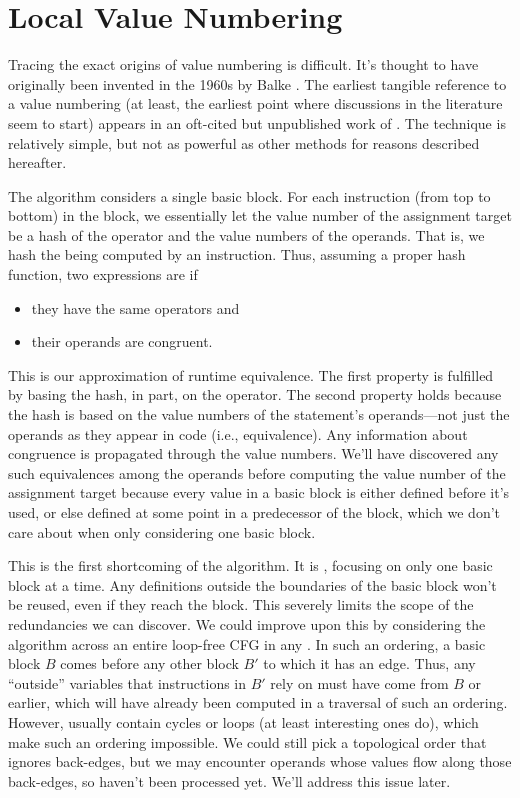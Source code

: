 \section{Local Value Numbering}\label{sec:vn:local}

Tracing the exact origins of value numbering is difficult.  It's thought to
have originally been invented in the 1960s by Balke \autocite{Simpson}.  The
earliest tangible reference to a value numbering (at least, the earliest point
where discussions in the literature seem to start) appears in an oft-cited but
unpublished work of \citeauthor{Cocke} \autocite*{Cocke}.  The technique is
relatively simple, but not as powerful as other methods for reasons described
hereafter.

The algorithm considers a single basic block.  For each instruction (from top
to bottom) in the block, we essentially let the value number of the assignment
target be a hash of the operator and the value numbers of the operands.  That
is, we hash the  being computed by an instruction.  Thus,
assuming a proper hash function, two expressions are  if
%
\begin{itemize}
%
  \item they have the same operators and
%
  \item their operands are congruent.
%
\end{itemize}
%
\noindent This is our approximation of runtime equivalence.  The first property
is fulfilled by basing the hash, in part, on the operator.  The second property
holds because the hash is based on the value numbers of the statement's
operands---not just the operands as they appear in code (i.e., 
equivalence).  Any information about congruence is propagated through the value
numbers.  We'll have discovered any such equivalences among the operands before
computing the value number of the assignment target because every value in a
basic block is either defined before it's used, or else defined at some point
in a predecessor of the block, which we don't care about when only considering
one basic block.

This is the first shortcoming of the algorithm.  It is , focusing
on only one basic block at a time.  Any definitions outside the boundaries of
the basic block won't be reused, even if they reach the block.  This severely
limits the scope of the redundancies we can discover.  We could improve upon
this by considering the algorithm across an entire loop-free \gls{CFG} in any
.  In such an ordering, a basic block $B$ comes before
any other block $B'$ to which it has an edge.  Thus, any ``outside'' variables
that instructions in $B'$ rely on must have come from $B$ or earlier, which
will have already been computed in a traversal of such an ordering.  However,
 usually contain cycles or loops (at least interesting ones do),
which make such an ordering impossible.  We could still pick a topological
order that ignores back-edges, but we may encounter operands whose values flow
along those back-edges, so haven't been processed yet.  We'll address this
issue later.

